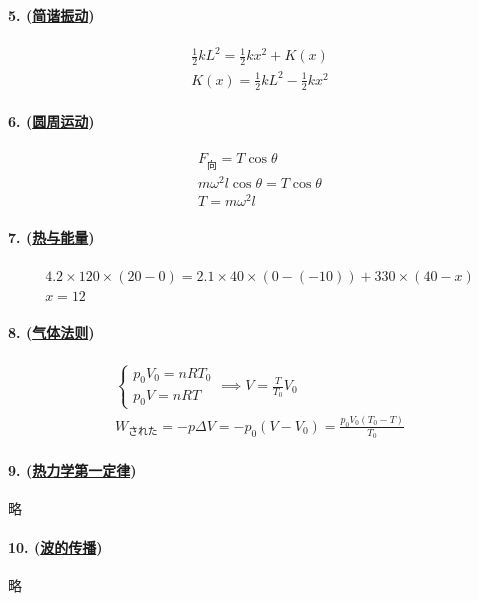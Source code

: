 \paragraph{5. (\hyperref[subsec:简谐振动]{简谐振动})}

\begin{gather*}
    \frac12kL^2=\frac12kx^2+K(x)\\
    K(x)=\frac12kL^2-\frac12kx^2
\end{gather*}

\paragraph{6. (\hyperref[subsec:圆周运动]{圆周运动})}

\begin{gather*}
    F_\textrm{向}=T\cos\theta\\
    m\omega^2l\cos\theta=T\cos\theta\\
    T=m\omega^2l
\end{gather*}

\paragraph{7. (\hyperref[sec:热与能量]{热与能量})}

\begin{gather*}
    4.2\times120\times(20-0)=2.1\times40\times(0-(-10))+330\times(40-x)\\
    x=12
\end{gather*}

\paragraph{8. (\hyperref[subsec:气体法则]{气体法则})}

\begin{gather*}
    \begin{cases}
        p_0V_0=nRT_0\\
        p_0V=nRT
    \end{cases}\implies V=\frac{T}{T_0}V_0\\
    W_\textrm{された}=-p\Delta V=-p_0(V-V_0)=\frac{p_0V_0(T_0-T)}{T_0}
\end{gather*}

\paragraph{9. (\hyperref[subsec:热力学第一定律]{热力学第一定律})} 略
\paragraph{10. (\hyperref[subsec:波的传播]{波的传播})} 略

